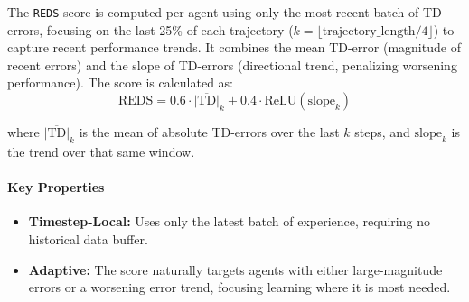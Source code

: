 
The \texttt{REDS} score is computed per-agent using only the most recent batch of TD-errors, focusing on the last 25\% of each trajectory ($k = \lfloor \text{trajectory\_length} / 4 \rfloor$) to capture recent performance trends. It combines the mean TD-error (magnitude of recent errors) and the slope of TD-errors (directional trend, penalizing worsening performance).
The score is calculated as:
\begin{equation}
    \text{REDS} = 0.6 \cdot \overline{|\text{TD}|}_k + 0.4 \cdot \text{ReLU}(\text{slope}_k)
    \label{eq:reds}
\end{equation}

where $\overline{|\text{TD}|}_k$ is the mean of absolute TD-errors over the last $k$ steps, and $\text{slope}_k$ is the trend over that same window.

\paragraph{Key Properties}
\begin{itemize}
    \item \textbf{Timestep-Local:} Uses only the latest batch of experience, requiring no historical data buffer.
    \item \textbf{Adaptive:} The score naturally targets agents with either large-magnitude errors or a worsening error trend, focusing learning where it is most needed.
\end{itemize}

